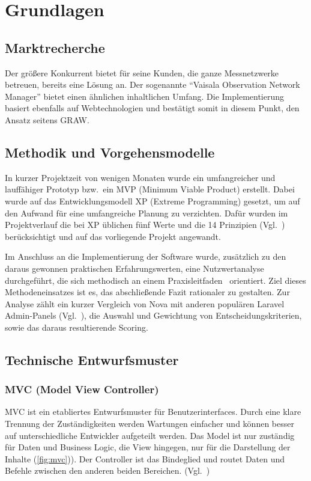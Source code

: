 \section{Grundlagen}

\subsection{Marktrecherche}
Der größere Konkurrent bietet für seine Kunden, die ganze Messnetzwerke betreuen, bereits eine Lösung an.
Der sogenannte \enquote{Vaisala Observation Network Manager}\cite{observation-network-manager} bietet einen ähnlichen inhaltlichen Umfang.
Die Implementierung basiert ebenfalls auf Webtechnologien und bestätigt somit in diesem Punkt, den Ansatz seitens GRAW.

\subsection{Methodik und Vorgehensmodelle}
In kurzer Projektzeit von wenigen Monaten wurde ein umfangreicher und lauffähiger Prototyp bzw.\ ein MVP (Minimum Viable Product) erstellt.
Dabei wurde auf das Entwicklungsmodell XP (Extreme Programming) gesetzt, um auf den Aufwand für eine umfangreiche Planung zu verzichten.
Dafür wurden im Projektverlauf die bei XP üblichen fünf Werte und die 14 Prinzipien (Vgl.~\cite{agile-prozesse}) berücksichtigt und auf das vorliegende Projekt angewandt.

Im Anschluss an die Implementierung der Software wurde, zusätzlich zu den daraus gewonnen praktischen Erfahrungswerten, eine Nutzwertanalyse durchgeführt, die sich methodisch an einem Praxisleitfaden~\cite{scoring-und-nutzwertanalysen} orientiert.
Ziel dieses Methodeneinsatzes ist es, das abschließende Fazit rationaler zu gestalten.
Zur Analyse zählt ein kurzer Vergleich von Nova mit anderen populären Laravel Admin-Panels (Vgl.~\cite{the-guide-to-laravel-admin-panels}), die Auswahl und Gewichtung von Entscheidungskriterien, sowie das daraus resultierende Scoring.

\subsection{Technische Entwurfsmuster}

\subsubsection{MVC (Model View Controller)}
MVC ist ein etabliertes Entwurfsmuster für Benutzerinterfaces.
Durch eine klare Trennung der Zuständigkeiten werden Wartungen einfacher und können besser auf unterschiedliche Entwickler aufgeteilt werden.
Das Model ist nur zuständig für Daten und Business Logic, die View hingegen, nur für die Darstellung der Inhalte (\ref{fig:mvc})).
Der Controller ist das Bindeglied und routet Daten und Befehle zwischen den anderen beiden Bereichen.
(Vgl.~\cite{mdn-glossary-mvc})

